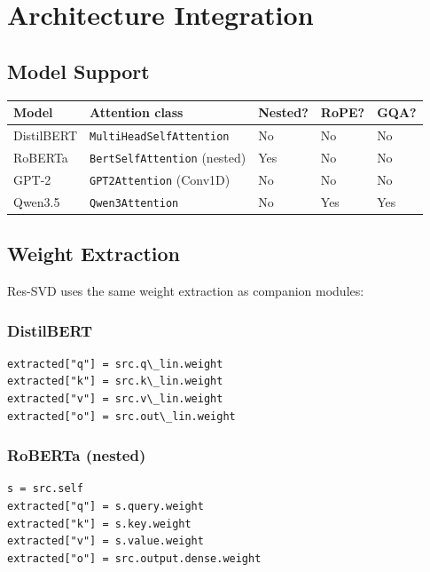 \section{Architecture Integration}

\subsection{Model Support}

\begin{table}[H]
\centering
\small
\begin{tabular}{lllll}
\toprule
\textbf{Model} & \textbf{Attention class} & \textbf{Nested?} & \textbf{RoPE?} & \textbf{GQA?} \\
\midrule
DistilBERT & \texttt{MultiHeadSelfAttention} & No & No & No \\
RoBERTa & \texttt{BertSelfAttention} (nested) & Yes & No & No \\
GPT-2 & \texttt{GPT2Attention} (Conv1D) & No & No & No \\
Qwen3.5 & \texttt{Qwen3Attention} & No & Yes & Yes \\
\bottomrule
\end{tabular}
\end{table}

\subsection{Weight Extraction}

Res-SVD uses the same weight extraction as companion modules:

\subsubsection{DistilBERT}

\begin{lstlisting}
extracted["q"] = src.q\_lin.weight
extracted["k"] = src.k\_lin.weight
extracted["v"] = src.v\_lin.weight
extracted["o"] = src.out\_lin.weight
\end{lstlisting}

\subsubsection{RoBERTa (nested)}

\begin{lstlisting}
s = src.self
extracted["q"] = s.query.weight
extracted["k"] = s.key.weight
extracted["v"] = s.value.weight
extracted["o"] = src.output.dense.weight
\end{lstlisting}


